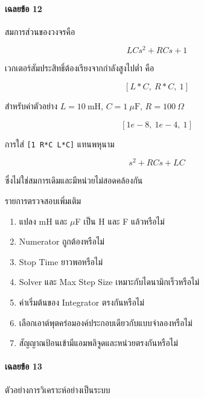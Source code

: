 \paragraph{เฉลยข้อ 12}

สมการส่วนของวงจรคือ

\[
LCs^2+RCs+1
\]

เวกเตอร์สัมประสิทธิ์ต้องเรียงจากกำลังสูงไปต่ำ คือ

\[
\boxed{[L*C,\ R*C,\ 1]}
\]

สำหรับค่าตัวอย่าง $L=10\ \text{mH}$, $C=1\ \mu\text{F}$, $R=100\ \Omega$

\[
\boxed{[1e-8,\ 1e-4,\ 1]}
\]

การใส่ \texttt{[1 R*C L*C]} แทนพหุนาม

\[
s^2+RCs+LC
\]

ซึ่งไม่ใช่สมการเดิมและมีหน่วยไม่สอดคล้องกัน

รายการตรวจสอบเพิ่มเติม

\begin{enumerate}
    \item แปลง mH และ $\mu$F เป็น H และ F แล้วหรือไม่
    \item Numerator ถูกต้องหรือไม่
    \item Stop Time ยาวพอหรือไม่
    \item Solver และ Max Step Size เหมาะกับไดนามิกเร็วหรือไม่
    \item ค่าเริ่มต้นของ Integrator ตรงกันหรือไม่
    \item เลือกเอาต์พุตคร่อมองค์ประกอบเดียวกับแบบจำลองหรือไม่
    \item สัญญาณป้อนเข้ามีแอมพลิจูดและหน่วยตรงกันหรือไม่
\end{enumerate}

\paragraph{เฉลยข้อ 13}

ตัวอย่างการวิเคราะห์อย่างเป็นระบบ

